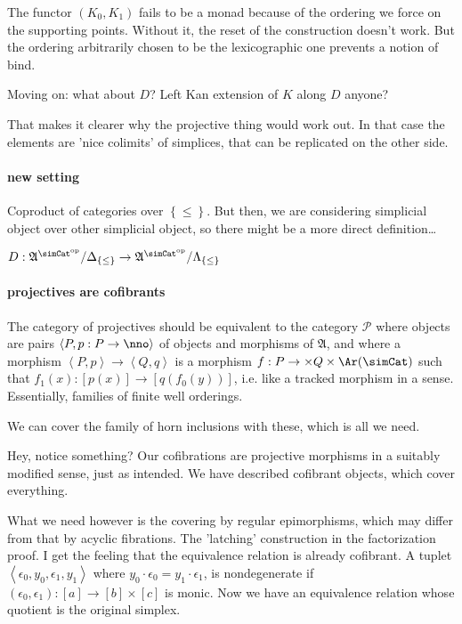 \documentclass{tac}
\newcommand\cat\mathcal
\newcommand\set[1]{\left\{#1\right\}}
\newcommand\dual{^{\mathrm{op}}}
\newcommand\s{^{\simCat\dual}}
\newcommand\of{:}
\newcommand\simplex\Delta
\newcommand\horn\Lambda
\newcommand\tuplet[1]{\left\langle #1 \right\rangle}
\newcommand\ambient{\mathfrak A}
\begin{document}
The functor $(K_0,K_1)$ fails to be a monad because of the ordering we force on the supporting points. Without it, the reset of the construction doesn't work. But the ordering arbitrarily chosen to be the lexicographic one prevents a notion of bind.

Moving on: what about $D$? Left Kan extension of $K$ along $D$ anyone?

That makes it clearer why the projective thing would work out.
In that case the elements are 'nice colimits' of simplices, 
that can be replicated on the other side.

\paragraph{new setting}
Coproduct of categories over $\set\leq$. But then, we are considering simplicial object over other simplicial object, so there might be a more direct definition\dots

$D\of \ambient\s/\simplex_{\set\leq} \to \ambient\s/\horn_{\set\leq}$


\paragraph{projectives are cofibrants}
The category of projectives should be equivalent to the category $\cat P$ where objects are pairs $\tuplet{P,p\of P\to\nno}$ of objects and morphisms of $\ambient$, and where a morphism $\tuplet{P,p}\to \tuplet{Q,q}$ is a morphism $f\of P\to \times Q\times \Ar(\simCat)$ such that $f_1(x)\of [p(x)]\to [q(f_0(y))]$, i.e. like a tracked morphism in a sense.
Essentially, families of finite well orderings.

We can cover the family of horn inclusions with these, which is all we need.

Hey, notice something? Our cofibrations are projective morphisms in a suitably modified sense, just as intended. We have described cofibrant objects, which cover everything.

What we need however is the covering by regular epimorphisms, which may differ from that by acyclic fibrations. The 'latching' construction in the factorization proof. I get the feeling that the equivalence relation is already cofibrant. A tuplet $\tuplet{\epsilon_0,y_0,\epsilon_1,y_1}$ where $y_0\cdot\epsilon_0 = y_1\cdot\epsilon_1$, is nondegenerate if $(\epsilon_0,\epsilon_1)\of [a]\to[b]\times[c]$ is monic. Now we have an equivalence relation whose quotient is the original simplex.
\end{document}
